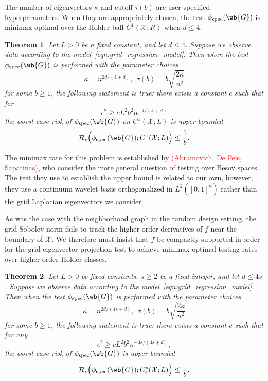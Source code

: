 \documentclass{article}
\newcommand{\1}{\mathbf{1}}
\newcommand{\Xset}{\mathcal{X}}
\newcommand{\spec}{\mathrm{spec}}
\theoremstyle{alden}
\theoremstyle{aldenthm}
\newtheorem{theorem}{Theorem}
\theoremstyle{definition}
\theoremstyle{remark}
\begin{document}
The number of eigenvectors $\kappa$ and cutoff $\tau(b)$ are user-specified hyperparameters. When they are appropriately chosen, the test $\phi_{\spec}(\wb{G})$ is minimax optimal over the Holder ball $C^{1}(\Xset;R)$ when $d \leq 4$.
\begin{theorem}
	\label{thm:holder_testing_rate_grid}
	Let $L > 0$ be a fixed constant, and let $d \leq 4$. Suppose we observe data according to the model~\eqref{eqn:grid_regression_model}. Then when the test $\phi_{\spec}(\wb{G})$ is performed with the parameter choices
	\begin{equation*}
	\kappa = n^{2d/(4 + d)},~~ \tau(b) = b\sqrt{\frac{2\kappa}{n^2}}
	\end{equation*}
	for some $b \geq 1$, the following statement is true: there exists a constant $c$ such that for 
	\begin{equation}
	\label{eqn:holder_testing_rate_grid_1}
	\epsilon^2 \geq c L^2 b^2 n^{-4/(4 + d)}
	\end{equation}
	the worst-case risk of $\phi_{\spec}(\wb{G})$ on $C^{1}(\Xset;L)$ is upper bounded
	\begin{equation}
	\label{eqn:holder_testing_rate_grid_2}
	\mathcal{R}_{\epsilon}\Bigl(\phi_{\spec}(\wb{G});C^{1}(\Xset;L)\Bigr) \leq \frac{1}{b}.
	\end{equation}
\end{theorem}
The minimax rate for this problem is established by \textcolor{red}{(Abramovich, De Feis, Sapatinas)}, who consider the more general question of testing over Besov spaces. The test they use to establish the upper bound is related to our own, however, they use a continuum wavelet basis orthogonalized in $L^2([0,1]^d)$ rather than the grid Laplacian eigenvectors we consider. 

As was the case with the neighborhood graph in the random design setting, the grid Sobolev norm fails to track the higher order derivatives of $f$ near the boundary of $\Xset$. We therefore must insist that $f$ be compactly supported in order for the grid eigenvector projection test to achieve minimax optimal testing rates over higher-order Holder classes.

\begin{theorem}
	\label{thm:holder_testing_rate_grid_higher_order}
	Let $L > 0$ be fixed constants, $s \geq 2$ be a fixed integer, and let $d \leq 4s$.  Suppose we observe data according to the model~\eqref{eqn:grid_regression_model}. Then when the test $\phi_{\spec}(\wb{G})$ is performed with the parameter choices
	\begin{equation*}
	\kappa = n^{2d/(4s + d)},~~ \tau(b) =  b\sqrt{\frac{2\kappa}{n^2}}
	\end{equation*} 
	for some $b \geq 1$, the following statement is true: there exists a constant $c$ such that for any
	\begin{equation*}
	\epsilon^2 \geq c L^2 b^2 n^{-4s/(4s + d)},
	\end{equation*}
	the worst-case risk of $\phi_{\spec}(\wb{G})$ is upper bounded
	\begin{equation*}
	\mathcal{R}_{\epsilon}\Bigl(\phi_{\spec}(\wb{G});C_c^{s}(\Xset;L)\Bigr) \leq \frac{1}{b}.
	\end{equation*}
\end{theorem}
\end{document}
